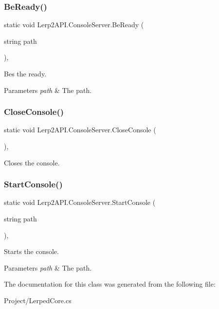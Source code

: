\subsubsection{\texorpdfstring{Be\+Ready()}{BeReady()}}
{\footnotesize\ttfamily static void Lerp2\+A\+P\+I.\+Console\+Server.\+Be\+Ready (\begin{DoxyParamCaption}\item[{string}]{path }\end{DoxyParamCaption})\hspace{0.3cm}{\ttfamily [inline]}, {\ttfamily [static]}}



Bes the ready. 


\begin{DoxyParams}{Parameters}
{\em path} & The path.\\
\hline
\end{DoxyParams}
\mbox{\label{class_lerp2_a_p_i_1_1_console_server_a9f9bdc6bc8ee74f1193d9d55ba7b0ea6}} 
\subsubsection{\texorpdfstring{Close\+Console()}{CloseConsole()}}
{\footnotesize\ttfamily static void Lerp2\+A\+P\+I.\+Console\+Server.\+Close\+Console (\begin{DoxyParamCaption}{ }\end{DoxyParamCaption})\hspace{0.3cm}{\ttfamily [inline]}, {\ttfamily [static]}}



Closes the console. 

\mbox{\label{class_lerp2_a_p_i_1_1_console_server_ababcc7dcd82a5ff056e3d511ff573f55}} 
\subsubsection{\texorpdfstring{Start\+Console()}{StartConsole()}}
{\footnotesize\ttfamily static void Lerp2\+A\+P\+I.\+Console\+Server.\+Start\+Console (\begin{DoxyParamCaption}\item[{string}]{path }\end{DoxyParamCaption})\hspace{0.3cm}{\ttfamily [inline]}, {\ttfamily [static]}}



Starts the console. 


\begin{DoxyParams}{Parameters}
{\em path} & The path.\\
\hline
\end{DoxyParams}


The documentation for this class was generated from the following file\+:\begin{DoxyCompactItemize}
\item 
Project/Lerped\+Core.\+cs\end{DoxyCompactItemize}
